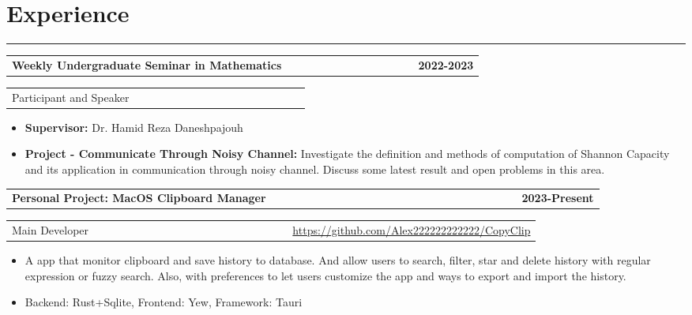 \documentclass{article}
\begin{document}
\section*{Experience}
    \hrule
    \vspace{0.5em}

    \noindent
    \begin{tabular}{p{0.76\linewidth} p{0.0\linewidth} R{0.14\linewidth}}
        \textbf{Weekly Undergraduate Seminar in Mathematics} & & \textbf{2022-2023}
    \end{tabular}

    \noindent
    \begin{tabular}{p{0.43\linewidth} p{0.0\linewidth} R{0.47\linewidth}}
        Participant and Speaker & &
    \end{tabular}
    \begin{itemize}[topsep=0.0em,itemsep=0.0em,parsep=0.0em]
        \item \textbf{Supervisor:} Dr. Hamid Reza Daneshpajouh
        \item \textbf{Project - Communicate Through Noisy Channel:} Investigate the definition and methods of computation of Shannon Capacity and its application in communication through noisy channel. Discuss some latest result and open problems in this area.
    \end{itemize}

    \noindent
    \begin{tabular}{p{0.76\linewidth} p{0.0\linewidth} R{0.14\linewidth}}
        \textbf{Personal Project: MacOS Clipboard Manager} & & \textbf{2023-Present}
    \end{tabular}

    \noindent
    \begin{tabular}{p{0.43\linewidth} p{0.0\linewidth} R{0.47\linewidth}}
        Main Developer & & \href{https://github.com/Alex222222222222/CopyClip}{https://github.com/Alex222222222222/CopyClip}
    \end{tabular}

    \noindent 
    \begin{itemize}[topsep=0.0em,itemsep=0.0em,parsep=0.0em]
        \item A app that monitor clipboard and save history to database. And allow users to search, filter, star and delete history with regular expression or fuzzy search. Also, with preferences to let users customize the app and ways to export and import the history.
        \item Backend: Rust+Sqlite, Frontend: Yew, Framework: Tauri
    \end{itemize}
\end{document}
